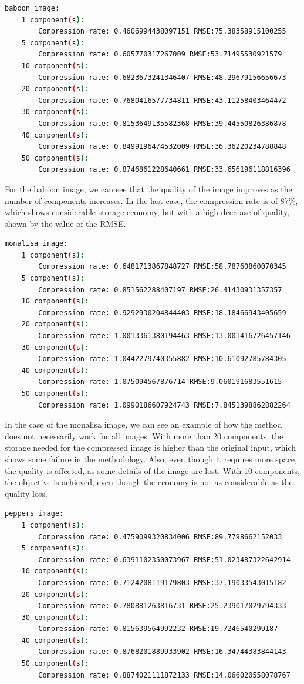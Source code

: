 \documentclass[]{IEEEtran}
\begin{document}
\begin{lstlisting}[language=sh, caption={Indicators Results for Baboon Image}, label={code:baboon-e}]
baboon image:
	1 component(s):
		Compression rate: 0.4606994438097151 RMSE:75.38358915100255
	5 component(s):
		Compression rate: 0.605770317267009 RMSE:53.71495530921579
	10 component(s):
		Compression rate: 0.6823673241346407 RMSE:48.29679156656673
	20 component(s):
		Compression rate: 0.7680416577734811 RMSE:43.11258403464472
	30 component(s):
		Compression rate: 0.8153649135582368 RMSE:39.44550826386878
	40 component(s):
		Compression rate: 0.8499196474532009 RMSE:36.36220234788848
	50 component(s):
		Compression rate: 0.8746861228640661 RMSE:33.656196118816396
\end{lstlisting}

For the baboon image, we can see that the quality of the image improves as the number of components increases. In the last case, the compression rate is of 87\%, which shows considerable storage economy, but with a high decrease of quality, shown by the value of the RMSE.

\begin{lstlisting}[language=sh, caption={Indicators Results for Monalisa Image}, label={code:monalisa-e}]
monalisa image:
	1 component(s):
		Compression rate: 0.6481713867848727 RMSE:58.78760860070345
	5 component(s):
		Compression rate: 0.851562288407197 RMSE:26.41430931357357
	10 component(s):
		Compression rate: 0.9292930204844403 RMSE:18.18466943405659
	20 component(s):
		Compression rate: 1.0013361380194463 RMSE:13.001416726457146
	30 component(s):
		Compression rate: 1.0442279740355882 RMSE:10.61092785784305
	40 component(s):
		Compression rate: 1.075094567876714 RMSE:9.060191683551615
	50 component(s):
		Compression rate: 1.0990186607924743 RMSE:7.8451398862882264
\end{lstlisting}

In the case of the monalisa image, we can see an example of how the method does not necessarily work for all images. With more than 20 components, the storage needed for the compressed image is higher than the original input, which shows some failure in the methodology. Also, even though it requires more space, the quality is affected, as some details of the image are lost. With 10 components, the objective is achieved, even though the economy is not as considerable as the quality loss. 

\begin{lstlisting}[language=sh, caption={Indicators Results for Peppers Image}, label={code:peppers-e}]
peppers image:
	1 component(s):
		Compression rate: 0.4759099320834006 RMSE:89.7798662152033
	5 component(s):
		Compression rate: 0.6391102350073967 RMSE:51.023487322642914
	10 component(s):
		Compression rate: 0.7124208119179803 RMSE:37.19033543015182
	20 component(s):
		Compression rate: 0.780881263816731 RMSE:25.239017029794333
	30 component(s):
		Compression rate: 0.815639564992232 RMSE:19.7246540299187
	40 component(s):
		Compression rate: 0.8768201889933902 RMSE:16.34744383844143
	50 component(s):
		Compression rate: 0.8874021111872133 RMSE:14.066020558078767
\end{lstlisting}
\end{document}
